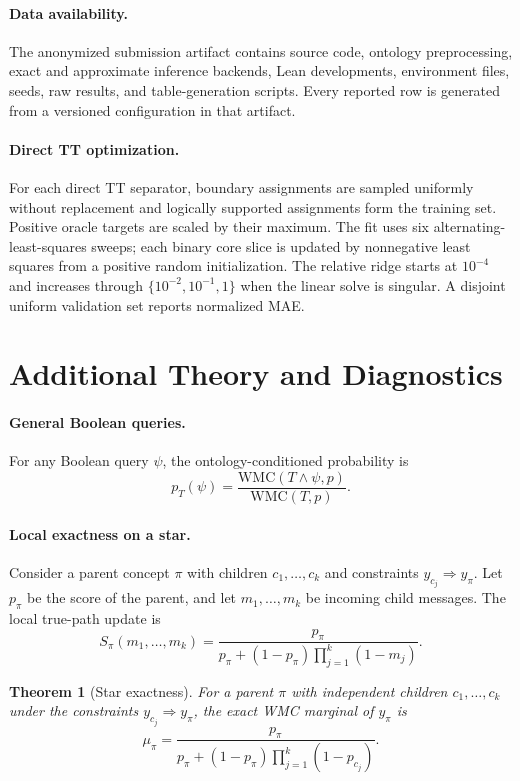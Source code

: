 \documentclass[letterpaper]{article}
\newtheorem{theorem}{Theorem}
\begin{document}
\paragraph{Data availability.}
The anonymized submission artifact contains source code, ontology
preprocessing, exact and approximate inference backends, Lean developments,
environment files, seeds, raw results, and table-generation scripts. Every
reported row is generated from a versioned configuration in that artifact.

\paragraph{Direct TT optimization.}
\label{app:direct-tt-optimization}
For each direct TT separator, boundary assignments are sampled uniformly
without replacement and logically supported assignments form the training
set. Positive oracle targets are scaled by their maximum. The fit uses six
alternating-least-squares sweeps; each binary core slice is updated by
nonnegative least squares from a positive random initialization. The
relative ridge starts at \(10^{-4}\) and increases through
\(\{10^{-2},10^{-1},1\}\) when the linear solve is singular. A disjoint
uniform validation set reports normalized MAE.

\section{Additional Theory and Diagnostics}
\label{app:additional-theory}

\paragraph{General Boolean queries.}
For any Boolean query \(\psi\), the ontology-conditioned probability is
\[
p_T(\psi)
=
\frac{\mathrm{WMC}(T\wedge \psi,p)}
     {\mathrm{WMC}(T,p)}.
\]

\paragraph{Local exactness on a star.}
Consider a parent concept \(\pi\) with children \(c_1,\ldots,c_k\) and
constraints \(y_{c_j}\Rightarrow y_\pi\). Let \(p_\pi\) be the score of
the parent, and let \(m_1,\ldots,m_k\) be incoming child messages. The
local true-path update is
\[
S_\pi(m_1,\ldots,m_k)
=
\frac{p_\pi}
     {p_\pi+(1-p_\pi)\prod_{j=1}^{k}(1-m_j)}.
\]

\begin{theorem}[Star exactness]
\label{thm:star}
For a parent \(\pi\) with independent children
\(c_1,\ldots,c_k\) under the constraints
\(y_{c_j}\Rightarrow y_\pi\), the exact WMC marginal of \(y_\pi\) is
\[
\mu_\pi
=
\frac{p_\pi}
     {p_\pi+(1-p_\pi)\prod_{j=1}^{k}(1-p_{c_j})}.
\]
\end{theorem}
\end{document}
